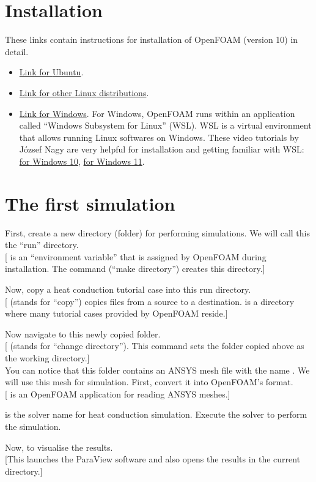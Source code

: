 \documentclass[10pt,a5paper]{article}
\newcommand{\linux}{\software{Linux}}
\newcommand{\openfoam}{\software{OpenFOAM}}
\newcommand{\paraview}{\software{ParaView}}
\newcommand{\software}[1]{\textsf{#1}}
\newcommand{\windows}{\software{Windows}}
\begin{document}
\section{Installation}
\label{sec:installation}
These links contain instructions for installation of \openfoam{} (version 10) in detail.
\begin{itemize}
    \item \href{https://openfoam.org/download/10-ubuntu/}{Link for \software{Ubuntu}}.
    \item \href{https://openfoam.org/download/10-linux/}{Link for other \linux{} distributions}.
    \item \href{https://openfoam.org/download/windows/}{Link for \windows}. For \windows{}, \openfoam{} runs within an application called \enquote{Windows Subsystem for Linux} (WSL). WSL is a virtual environment that allows running \linux{} softwares on \windows{}. These video tutorials by J\'{o}zsef Nagy are very helpful for installation and getting familiar with WSL: \href{https://www.youtube.com/watch?v=w0bBOWlVlvA}{for \windows{} 10}, \href{https://www.youtube.com/watch?v=CeEJS1eT9NE}{for \windows{} 11}.
\end{itemize}

\section{The first simulation}
\label{sec:first_simulation}
First, create a new directory (folder) for performing simulations. We will call this the \enquote{run} directory.\\
[ is an \enquote{environment variable} that is assigned by \openfoam{} during installation. The command  (\enquote{make directory}) creates this directory.]

Now, copy a heat conduction tutorial case into this run directory.\\
[ (stands for \enquote{copy}) copies files from a source to a destination.  is a directory where many tutorial cases provided by \openfoam{} reside.]

Now navigate to this newly copied folder.\\
[ (stands for \enquote{change directory}). This command sets the folder copied above as the working directory.]\\
You can notice that this folder contains an \software{ANSYS} mesh file with the name . We will use this mesh for simulation. First, convert it into \openfoam's format.\\
[ is an \openfoam{} application for reading \software{ANSYS} meshes.]

 is the solver name for heat conduction simulation. Execute the solver to perform the simulation.\\

Now, to visualise the results.\\
[This launches the \paraview{} software and also opens the results in the current directory.]
\end{document}
